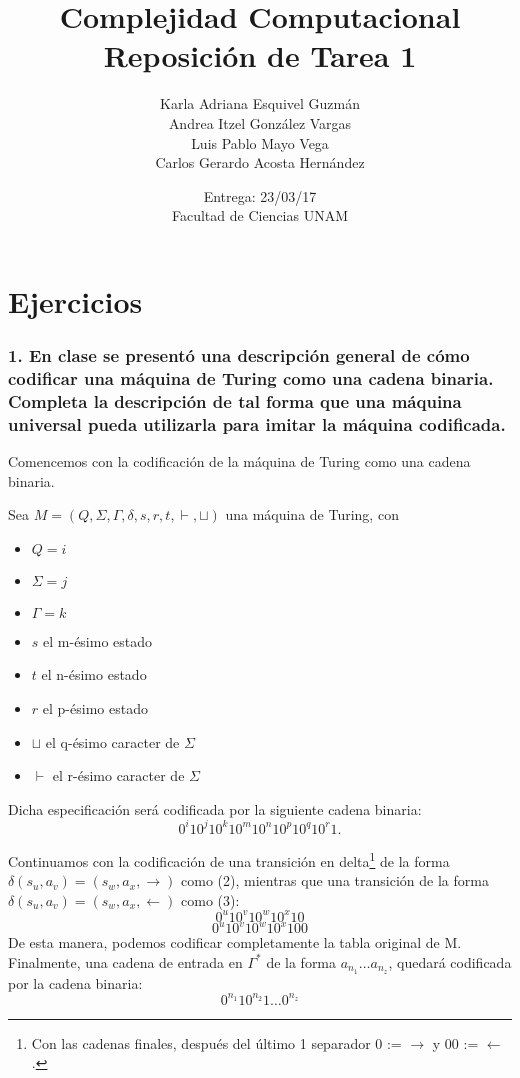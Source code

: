 \documentclass[12pt]{article}
\title{Complejidad Computacional \\ Reposición de Tarea 1}
\author{Karla Adriana Esquivel Guzmán \\ Andrea Itzel González Vargas\\ Luis Pablo Mayo Vega \\ Carlos Gerardo Acosta Hernández}
\date{Entrega: 23/03/17 \\ Facultad de Ciencias UNAM}
\begin{document}
\maketitle
\section*{Ejercicios}
\subsubsection*{1. En clase se presentó una descripción general de cómo codificar una máquina de Turing como una cadena binaria. Completa la descripción de tal forma que una máquina universal pueda utilizarla para imitar la máquina codificada.}

Comencemos con la codificación de la máquina de Turing como una cadena binaria.

Sea $M = (Q,\Sigma,\Gamma,\delta,s,r,t,\vdash,\sqcup)$ una máquina de Turing, con
\begin{itemize}
\item $Q = i$
\item $\Sigma = j$
\item $\Gamma = k$
\item $s$ el m-ésimo estado
\item $t$ el n-ésimo estado
\item $r$ el p-ésimo estado
\item $\sqcup$ el q-ésimo caracter de $\Sigma$
\item $\vdash$ el r-ésimo caracter de $\Sigma$ 
\end{itemize}
Dicha especificación será codificada por la siguiente cadena binaria:\\
\begin{equation}
  0^i10^j10^k10^m10^n10^p10^q10^r1.
\end{equation}

Continuamos con la codificación de una transición en delta\footnote{Con las cadenas finales, después del último 1 separador 
0 := $\rightarrow$ y 00 := $\leftarrow$.} de la forma $\delta(s_u,a_v) = (s_w,a_x,\rightarrow)$ como (2),
mientras que una transición de la forma $\delta(s_u,a_v) = (s_w,a_x,\leftarrow)$ como (3):\\
\begin{equation}
  0^u10^v10^w10^x10
\end{equation}
\begin{equation}
  0^u10^v10^w10^x100  
\end{equation}
De esta manera, podemos codificar completamente la tabla original de M.\\
Finalmente, una cadena de entrada en $\Gamma^*$ de la forma $a_{n_1} \dots a_{n_z}$, quedará codificada por la cadena binaria:\\
\begin{equation}
0^{n_1}10^{n_2}1\dots0^{n_z}
\end{equation}
\end{document}
